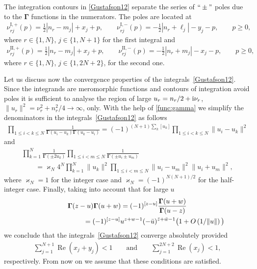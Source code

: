The integration contours in \eqref{Gustafson12} separate the series of $``\pm"$ poles due to the $\boldsymbol \Gamma$ functions in the numerators. The poles are located at
\begin{gather}\label{poles-I}
\nu^{\text{I},+}_{rj}(p)=\frac12{|n_r-m_j|} +x_j +p, \qquad \nu^{\text{I},-}_{rj}(p)=-\frac12{|n_r+\ell_j|} -y_j -p,
\qquad p\geq 0,
\end{gather}
where $r\in\{1, N\}$, $j\in\{1,N+1\}$ for the first integral and
\begin{gather*}
\nu^{\text{II},+}_{rj}(p)=\frac12{|n_r-m_j|} +x_j +p, \qquad \nu^{\text{II},-}_{rj}(p)=-\frac12{|n_r+m_j|} -x_j -p,\qquad p\geq 0,
\end{gather*}
where $r\in\{1, N\}$, $j\in\{1,2N+2\}$, for the second one.

Let us discuss now the convergence properties of the integrals~\eqref{Gustafson12}. Since the integrands are meromorphic functions and contours of integration avoid poles
it is sufficient to analyse the region of large $u_r=n_r/2+ {\rm i}\nu_r$, $ \|u_r\|^2=\nu_r^2+n_r^2/4 \to\infty$, only.
With the help of \eqref{func:gamma} we simplify the denominators in the integrals~\eqref{Gustafson12} as follows
\begin{gather}\label{den1}
\prod_{1\leq i<k\leq N} \frac1{\boldsymbol{\Gamma}(u_i- u_k)\boldsymbol{\Gamma}(u_k- u_i)} = (-1)^{(N+1)\sum_k [u_k] } \prod_{1\leq i<k\leq N}\|u_i-u_k\|^2
\end{gather}
and
\begin{gather}
\prod_{k=1}^{N}\frac1{\boldsymbol{\Gamma}(\pm 2u_k)} \prod_{1\leq i<m\leq N}\frac1{\boldsymbol \Gamma (\pm u_i\pm u_m)}\nonumber\\
\qquad{} =\varkappa_N 4^{N} \prod_{k=1}^N \|u_k\|^2
\prod_{1\leq i<m\leq N}\|u_i-u_m\|^2\|u_i+u_m\|^2,\label{den2}
\end{gather}
where $\varkappa_N=1$ for the integer case and $\varkappa_N=(-1)^{N(N+1)/2}$ for the half-integer case. Finally, taking
into account that for large $u$
\begin{gather}
\boldsymbol \Gamma(z -u) \boldsymbol \Gamma(u+w) =
(-1)^{[z-u]}\frac{\boldsymbol{\Gamma}(u+w)}{\boldsymbol{\Gamma}(u-z)} \nonumber\\
\hphantom{\boldsymbol \Gamma(z -u) \boldsymbol \Gamma(u+w)}{} = (-1)^{[z-u]}
 u^{z+w-1} (-\bar u)^{\bar z+\bar w -1}\bigl(1+O\left(1/\|u\|\right)\bigl) \label{large-u-as}
\end{gather}
we conclude that the integrals~\eqref{Gustafson12} converge absolutely provided
\begin{gather}\label{convergence}
 \sum_{j=1}^{N+1} \operatorname{Re}(x_j+y_j) <1 \qquad \text{and} \qquad \sum_{j=1}^{2N+2} \operatorname{Re} (x_j) <1,
\end{gather}
respectively. From now on we assume that these conditions are satisfied.

